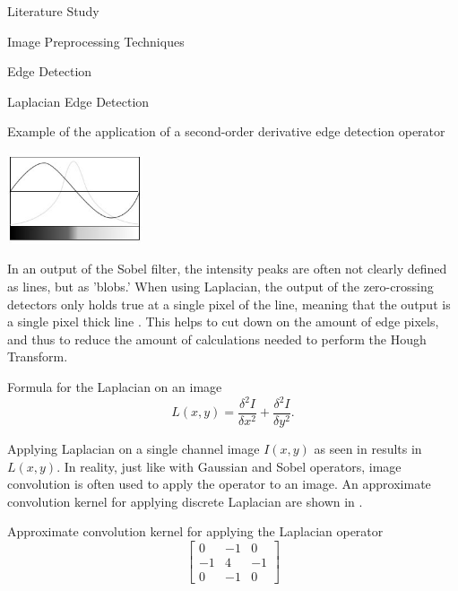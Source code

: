 \documentclass{matthijs}
\begin{document}
\begin{hoofdstuk}{Literature Study}
\begin{paragraaf}{Image Preprocessing Techniques}
\begin{subparagraaf}{Edge Detection}
\begin{subsubparagraaf}{Laplacian Edge Detection}
					\begin{figuur}{Example of the application of a second-order derivative edge detection operator}

						\includegraphics[width=0.3\textwidth]{sinha2017sobel-img3.jpg}
						\cite{sinha2017sobel}

					\end{figuur}

					\bigskip

					In an output of the Sobel filter, the intensity peaks are often not clearly defined as lines, but as 'blobs.'
					When using Laplacian, the output of the zero-crossing detectors only holds true at a single pixel of the line, meaning that the output is a single pixel thick line \cite{alazzawi2015edge}.
					This helps to cut down on the amount of edge pixels, and thus to reduce the amount of calculations needed to perform the Hough Transform.

					\bigskip

					\begin{figuur}{Formula for the Laplacian on an image}
						\begin{equation*}
							L(x,y) = \frac{\delta^2 I}{\delta x^2} + \frac{\delta^2 I}{\delta y^2}.
						\end{equation*}

						\cite{fisher2003hypermedia}
					\end{figuur}

					Applying Laplacian on a single channel image $I(x,y)$ as seen in  results in $L(x,y)$.
					In reality, just like with Gaussian and Sobel operators, image convolution is often used to apply the operator to an image.
					An approximate convolution kernel for applying discrete Laplacian are shown in .

					\begin{figuur}{Approximate convolution kernel for applying the Laplacian operator}
						\begin{equation*}
							\begin{bmatrix}
								0 & -1 & 0 \\
								-1 & 4 & -1 \\
								0 & -1 & 0
							\end{bmatrix}
						\end{equation*}


\end{figuur}
\end{subsubparagraaf}
\end{subparagraaf}
\end{paragraaf}
\end{hoofdstuk}
\end{document}
